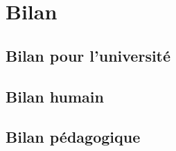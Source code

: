 \chapter{Bilan}

\section{Bilan pour l'universit\'e}

\section{Bilan humain}

\section{Bilan p\'edagogique}

\clearpage

